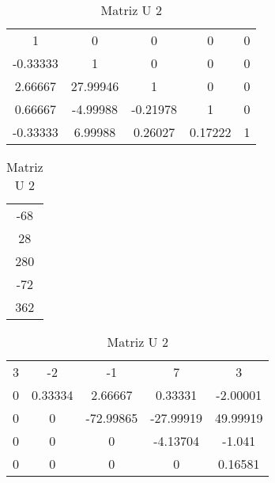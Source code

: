 \documentclass[12pt]{article}
\begin{document}
\begin{table}[!ht]
  \begin{minipage}[b]{.36\linewidth}

    \centering
    \begin{tabular}{|c c c c c|}
        1                 &         0                   &           0             &   0     &   0   \\
        -0.33333          &         1                   &          0               &   0     &   0   \\
        2.66667           &         27.99946           &          1                &   0     &   0   \\
        0.66667          &         -4.99988           &           -0.21978          &   1    &     0  \\
        -0.33333          &         6.99988           &           0.26027           &   0.17222    &     1\\
    \end{tabular}
    \caption{Matriz LU 2}
    \label{tab:dir}


  \end{minipage}\hfill
  \begin{minipage}[b]{.46\linewidth}

    \centering
    \begin{tabular}{|c|}
        -68\\
        28\\
        280\\
        -72\\
        362\\
    \end{tabular}
    \caption{Resolução Matriz 2}
    \label{tab:dir}
  \end{minipage}\hfill
  \begin{minipage}[b]{.36\linewidth}

    \centering
    \begin{tabular}{|c c c c c|}
        3                 &         -2       &           -1             &   7     &   3   \\
        0          &         0.33334          &          2.66667        &   0.33331     &   -2.00001   \\
        0           &         0               &          -72.99865      &   -27.99919     &   49.99919   \\
        0          &         0                &           0             &   -4.13704    &     -1.041\\
        0          &         0                &           0             &   0    &     0.16581\\
    \end{tabular}
      \caption{Matriz U 2}
    \label{tab:esq}
  \end{minipage}

\end{table}
\end{document}
